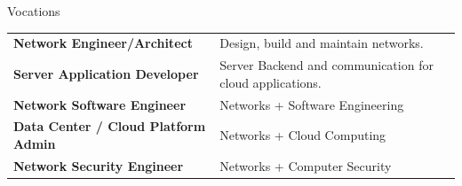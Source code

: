 \begin{sidenotebox}{Vocations}
    \begin{tabular}{l p{}}
        \textbf{Network Engineer/Architect}         & Design, build and maintain networks.                     \\
        \textbf{Server Application Developer}       & Server Backend and communication for cloud applications. \\
        \textbf{Network Software Engineer}          & Networks + Software Engineering                          \\
        \textbf{Data Center / Cloud Platform Admin} & Networks + Cloud Computing                               \\
        \textbf{Network Security Engineer}          & Networks + Computer Security                             \\
    \end{tabular}
\end{sidenotebox}
